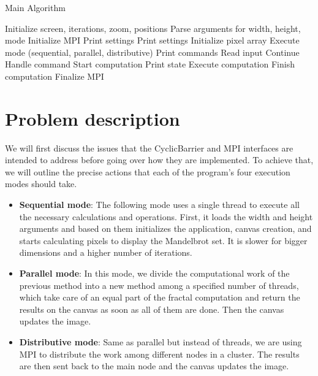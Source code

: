 \documentclass[sigconf]{acmart}
\begin{document}
\begin{algorithm}
\caption{Main Algorithm}
\begin{algorithmic}[1]
\State Initialize screen, iterations, zoom, positions
\State Parse arguments for width, height, mode
    \State Initialize MPI
        \State Print settings
    \EndIf
\Else
    \State Print settings
\EndIf
\State Initialize pixel array
\State Execute mode (sequential, parallel, distributive)
\State Print commands
    \State Read input
            \State Continue
        \EndIf
        \State Handle command
        \State Start computation
        \State Print state
        \State Execute computation
        \State Finish computation
    \EndFor
\EndWhile
{}
    \State Finalize MPI
\EndIf
\end{algorithmic}
\end{algorithm}

\section{Problem description}

 We will first discuss the issues that the CyclicBarrier and MPI interfaces are intended to address before going over how they are implemented. To achieve that, we will outline the precise actions that each of the program's four execution modes should take.

\begin{itemize}
    \item \textbf{Sequential mode}: The following mode uses a single thread to execute all the necessary calculations and operations. First, it loads the width and height arguments and based on them initializes the application, canvas creation, and starts calculating pixels to display the Mandelbrot set. It is slower for bigger dimensions and a higher number of iterations.
    \item \textbf{Parallel mode}: In this mode, we divide the computational work of the previous method into a new method among a specified number of threads, which take care of an equal part of the fractal computation and return the results on the canvas as soon as all of them are done. Then the canvas updates the image.
    \item \textbf{Distributive mode}: Same as parallel but instead of threads, we are using MPI to distribute the work among different nodes in a cluster. The results are then sent back to the main node and the canvas updates the image.
\end{itemize}
\end{document}
